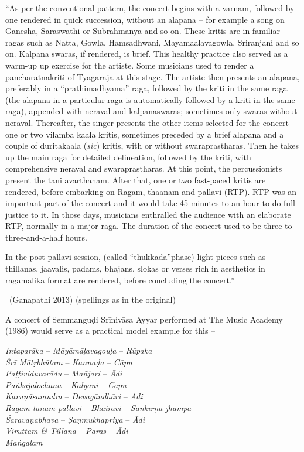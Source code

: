 \begin{myquote}
“As per the conventional pattern, the concert begins with a varnam, followed by one rendered in quick succession, without an alapana – for example a song on Ganesha, Saraswathi or Subrahmanya and so on. These kritis are in familiar ragas such as Natta, Gowla, Hamsadhwani, Mayamaalavagowla, Sriranjani and so on. Kalpana swaras, if rendered, is brief. This healthy practice also served as a warm-up up exercise for the artiste. Some musicians used to render a pancharatnakriti of Tyagaraja at this stage. The artiste then presents an alapana, preferably in a “prathimadhyama” raga, followed by the kriti in the same raga (the alapana in a particular raga is automatically followed by a kriti in the same raga), appended with neraval and kalpanaswaras; sometimes only swaras without neraval. Thereafter, the singer presents the other items selected for the concert – one or two vilamba kaala kritis, sometimes preceded by a brief alapana and a couple of duritakaala (\textit{sic}) kritis, with or without swaraprastharas. Then he takes up the main raga for detailed delineation, followed by the kriti, with comprehensive neraval and swaraprastharas. At this point, the percussionists present the tani avarthanam. After that, one or two fast-paced kritis are rendered, before embarking on Ragam, thaanam and pallavi (RTP). RTP was an important part of the concert and it would take 45 minutes to an hour to do full justice to it. In those days, musicians enthralled the audience with an elaborate RTP, normally in a major raga. The duration of the concert used to be three to three-and-a-half hours.
\end{myquote}

\begin{myquote}
In the post-pallavi session, (called “thukkada”phase) light pieces such as thillanas, jaavalis, padams, bhajans, slokas or verses rich in aesthetics in ragamalika format are rendered, before concluding the concert.” 

~\hfill (Ganapathi 2013) (spellings as in the original)
\end{myquote}

A concert of Semmanguḍi Srīnivāsa Ayyar performed at The Music Academy (1986) would serve as a practical model example for this –

\textit{Intaparāka} – \textit{Māyāmāḷavagouḷa} – \textit{Rūpaka}\\\textit{Śrī Mātṛbhūtam} – \textit{Kannaḍa} – \textit{Cāpu}\\\textit{Paṭṭividuvarādu} – \textit{Mañjari} – \textit{Ādi}\\\textit{Paṅkajalochana} – \textit{Kalyāni} – \textit{Cāpu} \\\textit{Karuṇāsamudra} – \textit{Devagāndhāri} – \textit{Ādi} \\\textit{Rāgam tānam pallavi} – \textit{Bhairavi} – \textit{Sankīrṇa jhampa}\\\textit{Śaravaṇabhava} – \textit{Ṣaṇmukhapriya} – \textit{Ādi}\\\textit{Viruttam \& Tillāna} – \textit{Paras} – \textit{Ādi} \\\textit{Maṅgalam}

